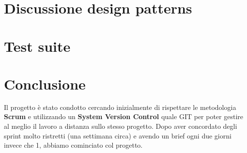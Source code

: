 \documentclass[12pt, a4paper]{article}
\numberwithin{equation}{section} %
\begin{document}






\section{Discussione design patterns}


\section{Test suite}


\section{Conclusione}
Il progetto è stato condotto cercando inizialmente di rispettare le metodologia \textbf{Scrum} e utilizzando un \textbf{System Version Control} quale GIT per poter gestire al meglio il lavoro a distanza sullo stesso progetto. Dopo aver concordato degli sprint molto ristretti (una settimana circa) e avendo un brief ogni due giorni invece che 1, abbiamo cominciato col progetto.
\end{document}
